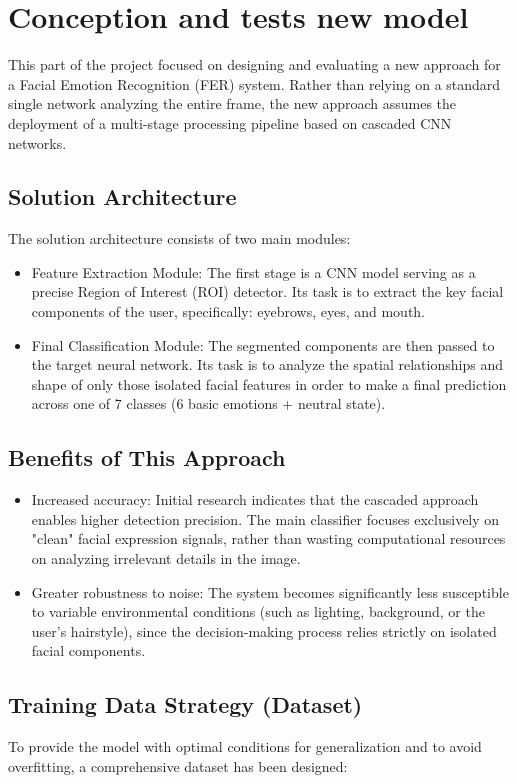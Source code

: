\documentclass{article}
\begin{document}
\section{Conception and tests new model}
This part of the project focused on designing and evaluating a new approach for a Facial Emotion Recognition (FER) system. Rather than relying on a standard single network analyzing the entire frame, the new approach assumes the deployment of a multi-stage processing pipeline based on cascaded CNN networks.

\subsection{Solution Architecture}
The solution architecture consists of two main modules:

\begin{itemize}
    \item Feature Extraction Module: The first stage is a CNN model serving as a precise Region of Interest (ROI) detector. Its task is to extract the key facial components of the user, specifically: eyebrows, eyes, and mouth.
    \item Final Classification Module: The segmented components are then passed to the target neural network. Its task is to analyze the spatial relationships and shape of only those isolated facial features in order to make a final prediction across one of 7 classes (6 basic emotions + neutral state).
\end{itemize}

\subsection{Benefits of This Approach}
\begin{itemize}
    \item Increased accuracy: Initial research indicates that the cascaded approach enables higher detection precision. The main classifier focuses exclusively on "clean" facial expression signals, rather than wasting computational resources on analyzing irrelevant details in the image.
    \item Greater robustness to noise: The system becomes significantly less susceptible to variable environmental conditions (such as lighting, background, or the user's hairstyle), since the decision-making process relies strictly on isolated facial components.
\end{itemize}

\subsection{Training Data Strategy (Dataset)}
To provide the model with optimal conditions for generalization and to avoid overfitting, a comprehensive dataset has been designed:
\end{document}
